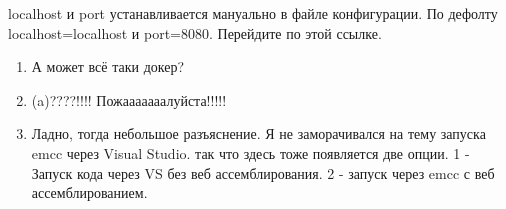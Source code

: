 \documentclass[12pt]{article}
\begin{document}
\begin{enumerate}
\begin{tcolorbox}[colback=green!10!white,colframe=green!70!black,title=\textbf{Docker}]
\begin{enumerate}
            localhost и port устанавливается мануально в файле конфигурации. По дефолту 
            localhost=localhost и port=8080. Перейдите по этой ссылке.
          \end{enumerate}
        \end{tcolorbox}
        \begin{tcolorbox}[colback=yellow!10!white,colframe=red!75!black,title=\textbf{Not Docker}]
          \begin{enumerate}
            \item А может всё таки докер?
            \item (a)????!!!! Пожааааааалуйста!!!!!
            \item Ладно, тогда небольшое разъяснение. 
            Я не заморачивался на тему запуска emcc через Visual Studio.
            так что здесь тоже появляется две опции. 1 - Запуск кода через
            VS без веб ассемблирования. 2 - запуск через emcc с веб ассемблированием.

\end{enumerate}
\end{tcolorbox}
\end{enumerate}
\end{document}
